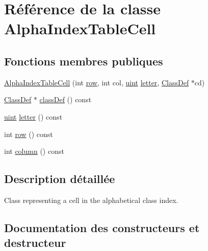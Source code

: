 \hypertarget{class_alpha_index_table_cell}{}\section{Référence de la classe Alpha\+Index\+Table\+Cell}
\label{class_alpha_index_table_cell}
\subsection*{Fonctions membres publiques}
\begin{DoxyCompactItemize}
\item 
\hyperlink{class_alpha_index_table_cell_ae4cedd00f90fe112a3ef77760056e716}{Alpha\+Index\+Table\+Cell} (int \hyperlink{class_alpha_index_table_cell_a09e803dce5bb9557ac48cc90bdea8ffa}{row}, int col, \hyperlink{qglobal_8h_a4d3943ddea65db7163a58e6c7e8df95a}{uint} \hyperlink{class_alpha_index_table_cell_a36f84cbc1b63ecf0598c6751c2576636}{letter}, \hyperlink{class_class_def}{Class\+Def} $\ast$cd)
\item 
\hyperlink{class_class_def}{Class\+Def} $\ast$ \hyperlink{class_alpha_index_table_cell_a07f7bc0c0a2811a40a3cd49e94d90505}{class\+Def} () const 
\item 
\hyperlink{qglobal_8h_a4d3943ddea65db7163a58e6c7e8df95a}{uint} \hyperlink{class_alpha_index_table_cell_a36f84cbc1b63ecf0598c6751c2576636}{letter} () const 
\item 
int \hyperlink{class_alpha_index_table_cell_a09e803dce5bb9557ac48cc90bdea8ffa}{row} () const 
\item 
int \hyperlink{class_alpha_index_table_cell_a51cb70403e4ff0e13902760b12e2996a}{column} () const 
\end{DoxyCompactItemize}


\subsection{Description détaillée}
Class representing a cell in the alphabetical class index. 

\subsection{Documentation des constructeurs et destructeur}
\hypertarget{class_alpha_index_table_cell_ae4cedd00f90fe112a3ef77760056e716}{}
